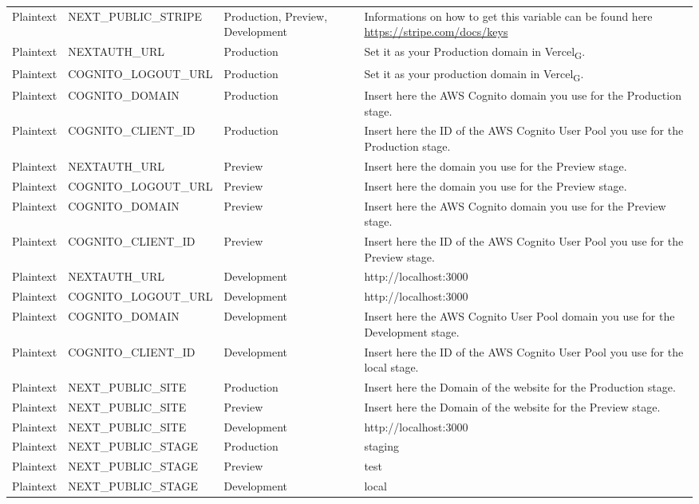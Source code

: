 \begin{enumerate}
{\begin{longtable}{c C{6cm} C{3cm} C{5cm}}
Plaintext & NEXT\_PUBLIC\_STRIPE & Production, Preview, Development & Informations on how to get this variable can be found here \url{https://stripe.com/docs/keys}\\
Plaintext & NEXTAUTH\_URL & Production & Set it as your Production domain in Vercel\textsubscript{G}.\\
Plaintext & COGNITO\_LOGOUT\_URL & Production & Set it as your production domain in Vercel\textsubscript{G}.\\
Plaintext & COGNITO\_DOMAIN & Production & Insert here the AWS Cognito domain you use for the Production stage.\\
Plaintext & COGNITO\_CLIENT\_ID & Production & Insert here the ID of the AWS Cognito User Pool you use for the Production stage.\\
Plaintext & NEXTAUTH\_URL & Preview & Insert here the domain you use for the Preview stage.\\
Plaintext & COGNITO\_LOGOUT\_URL & Preview & Insert here the domain you use for the Preview stage.\\
Plaintext & COGNITO\_DOMAIN & Preview & Insert here the AWS Cognito domain you use for the Preview stage.\\
Plaintext & COGNITO\_CLIENT\_ID & Preview & Insert here the ID of the AWS Cognito User Pool you use for the Preview stage.\\
Plaintext & NEXTAUTH\_URL & Development & http://localhost:3000 \\
Plaintext & COGNITO\_LOGOUT\_URL & Development & http://localhost:3000 \\
Plaintext & COGNITO\_DOMAIN & Development & Insert here the AWS Cognito User Pool domain you use for the Development stage.\\
Plaintext & COGNITO\_CLIENT\_ID & Development & Insert here the ID of the AWS Cognito User Pool you use for the local stage.\\
Plaintext & NEXT\_PUBLIC\_SITE & Production & Insert here the Domain of the website for the Production stage.\\
Plaintext & NEXT\_PUBLIC\_SITE & Preview & Insert here the Domain of the website for the Preview stage.\\
Plaintext & NEXT\_PUBLIC\_SITE & Development & http://localhost:3000\\
Plaintext & NEXT\_PUBLIC\_STAGE & Production & staging\\
Plaintext & NEXT\_PUBLIC\_STAGE & Preview & test\\
Plaintext & NEXT\_PUBLIC\_STAGE & Development & local\\

\end{longtable}}
\end{enumerate}
